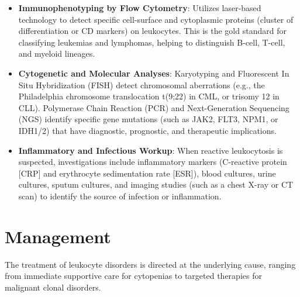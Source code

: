 \begin{itemize}
  \item \textbf{Immunophenotyping by Flow Cytometry}: Utilizes laser-based technology to detect specific cell-surface and cytoplasmic proteins (cluster of differentiation or CD markers) on leukocytes. This is the gold standard for classifying leukemias and lymphomas, helping to distinguish B-cell, T-cell, and myeloid lineages.
  \item \textbf{Cytogenetic and Molecular Analyses}: Karyotyping and Fluorescent In Situ Hybridization (FISH) detect chromosomal aberrations (e.g., the Philadelphia chromosome translocation t(9;22) in CML, or trisomy 12 in CLL). Polymerase Chain Reaction (PCR) and Next-Generation Sequencing (NGS) identify specific gene mutations (such as JAK2, FLT3, NPM1, or IDH1/2) that have diagnostic, prognostic, and therapeutic implications.
  \item \textbf{Inflammatory and Infectious Workup}: When reactive leukocytosis is suspected, investigations include inflammatory markers (C-reactive protein [CRP] and erythrocyte sedimentation rate [ESR]), blood cultures, urine cultures, sputum cultures, and imaging studies (such as a chest X-ray or CT scan) to identify the source of infection or inflammation.
\end{itemize}

\section*{Management}
The treatment of leukocyte disorders is directed at the underlying cause, ranging from immediate supportive care for cytopenias to targeted therapies for malignant clonal disorders.

